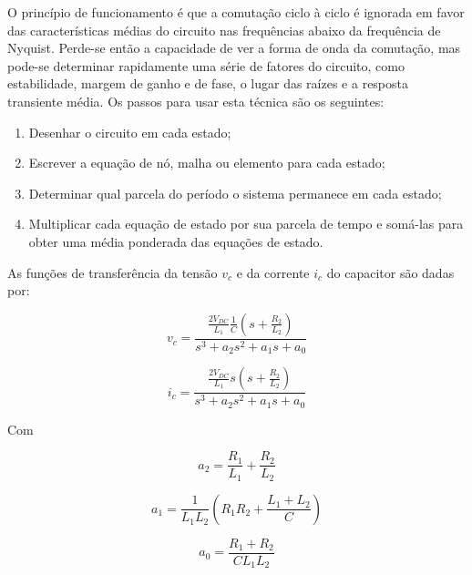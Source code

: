     O princípio de funcionamento é que a comutação ciclo à ciclo é ignorada em
    favor das características médias do circuito nas frequências abaixo da
    frequência de Nyquist. Perde-se então a capacidade de ver a forma de onda
    da comutação, mas pode-se determinar rapidamente uma série de fatores
    do circuito, como estabilidade, margem de ganho e de fase, o lugar das
    raízes e a resposta transiente média. Os passos para usar esta técnica são
    os seguintes:

    \begin{enumerate}
        \item Desenhar o circuito em cada estado;
        \item Escrever a equação de nó, malha ou elemento para cada estado;
        \item Determinar qual parcela do período o sistema permanece em cada estado;
        \item Multiplicar cada equação de estado por sua parcela de tempo e somá-las
            para obter uma média ponderada das equações de estado.
    \end{enumerate}

    As funções de transferência da tensão $v_c$ e da corrente $i_c$ do
    capacitor são dadas por:

    \begin{equation}
        v_c = \frac{\frac{2V_{DC}}{L_1} \frac{1}{C} \left( s + \frac{R_2}{L_2} \right)}{s^3 + a_2 s^2 + a_1 s + a_0}
        \label{eq:vc}
    \end{equation}

    \begin{equation}
        i_c = \frac{\frac{2V_{DC}}{L_1} s \left( s + \frac{R_2}{L_2} \right)}{s^3 + a_2 s^2 + a_1 s + a_0}
        \label{eq:ic}
    \end{equation}

    Com

    \begin{equation*}
        a_2 = \frac{R_1}{L_1} + \frac{R_2}{L_2}
    \end{equation*}

    \begin{equation*}
        a_1 = \frac{1}{L_1 L_2} \left( R_1 R_2 + \frac{L_1 + L_2}{C} \right)
    \end{equation*}

    \begin{equation*}
        a_0 = \frac{R_1 + R_2}{C L_1 L_2}
    \end{equation*}

